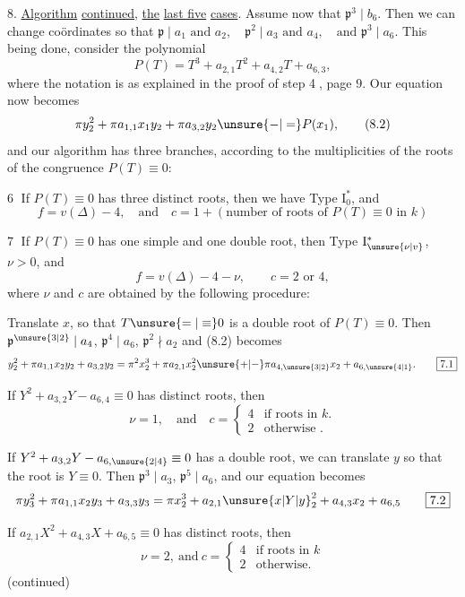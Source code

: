 8. \uline{Algorithm} \uline{continued}, \uline{the} \uline{last five} \uline{cases}. Assume now that $\boxed{\mathfrak p^3\mid b_6}$. Then we can change coördinates so that $\boxed{\mathfrak p\mid a_1\text{ and }a_2,\quad \mathfrak p^2\mid a_3\text{ and }a_4,\quad \text{and }\mathfrak p^3\mid a_6}$. This being done, consider the polynomial
\[
 P(T)=T^3+a_{2,1}T^2+a_{4,2}T+a_{6,3},
 \tag*{(8.1)}
\]
where the notation is as explained in the proof of step \textcircled{4}, page $9$. Our equation now becomes
\[
 \pi y_2^2+\pi a_{1,1}x_1y_2+\pi a_{3,2}y_2\unsure{-|=}P(x_1),
 \tag*{(8.2)}
\]
and our algorithm has three branches, according to the multiplicities of the roots of the congruence $P(T)\equiv0$:

\reversemarginpar
{}\textcircled{6} If $P(T)\equiv0$ has three distinct roots, then we have Type $\mathrm I_0^{*}$, and
\[
 f=v(\Delta)-4,\quad\text{and}\quad c=1+(\text{number of roots of }P(T)\equiv0\text{ in }k)
\]

\textcircled{7} If $P(T)\equiv0$ has one simple and one double root, then Type $\mathrm I_{\unsure{\nu|v}}^{*}$, $\nu>0$, and
\[
 f=v(\Delta)-4-\nu,\qquad c=2\text{ or }4,
\]
where $\nu$ and $c$ are obtained by the following procedure:

%
Translate $x$, so that $T\unsure{=|\equiv}0$ is a double root of $P(T)\equiv0$. Then $\mathfrak p^{\unsure{3|2}}\mid a_4$, $\mathfrak p^4\mid a_6$, $\mathfrak p^2\nmid a_2$ and (8.2) becomes
\[
 y_2^2+\pi a_{1,1}x_2y_2+a_{3,2}y_2
 =\pi^2x_2^3+\pi a_{2,1}x_2^2\unsure{+|-}\pi a_{4,\unsure{3|2}}x_2+a_{6,\unsure{4|1}}.
 \tag*{\fbox{7.1}}
\]

If $Y^2+a_{3,2}Y-a_{6,4}\equiv0$ has distinct roots, then
\[
 \nu=1,\quad\text{and}\quad c=\begin{cases}4&\text{if roots in }k.\\2&\text{otherwise }.\end{cases}
\]

If $Y^2+a_{3,2}Y-a_{6,\unsure{2|4}}\equiv0$ has a double root, we can translate $y$ so that the root is $Y\equiv0$. Then $\mathfrak p^3\mid a_3$, $\mathfrak p^5\mid a_6$, and our equation becomes
\[
 \pi y_3^2+\pi a_{1,1}x_2y_3+a_{3,3}y_3
 =\pi x_2^3+a_{2,1}{\unsure{x|Y|y}}_2^2+a_{4,3}x_2+a_{6,5}
 \tag*{\fbox{7.2}}
\]

If $a_{2,1}X^2+a_{4,3}X+a_{6,5}\equiv0$ has distinct roots, then
\[
 \nu=2,\ \text{and}\ c=\begin{cases}4&\text{if roots in }k\\2&\text{otherwise}.\end{cases}
\]
\normalmarginpar
\hfill(continued)
\clearpage
